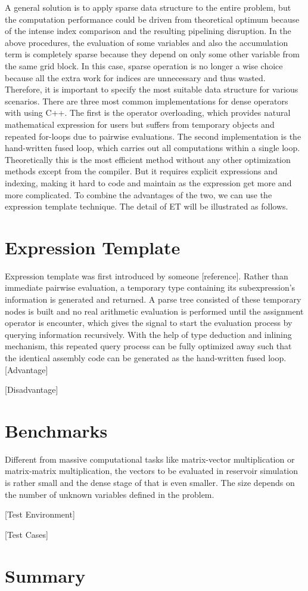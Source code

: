 \documentclass[10pt]{article}
\begin{document}
A general solution is to apply sparse data structure to the entire problem, but the computation performance could be driven from theoretical optimum because of the intense index comparison and the resulting pipelining disruption. In the above procedures, the evaluation of some variables and also the accumulation term is completely sparse because they depend on only some other variable from the same grid block. In this case, sparse operation is no longer a wise choice because all the extra work for indices are unnecessary and thus wasted. Therefore, it is important to specify the most suitable data structure for various scenarios.
There are three most common implementations for dense operators with using C++. The first is the operator overloading, which provides natural mathematical expression for users but suffers from temporary objects  and repeated for-loops due to pairwise evaluations. The second implementation is the hand-written fused loop, which carries out all computations within a single loop. Theoretically this is the most efficient method without any other optimization methods except from the compiler. But it requires explicit expressions and indexing, making it hard to code and maintain as the expression get more and more complicated. To combine the advantages of the two, we can use the expression template technique. The detail of ET will be illustrated as follows.

\section{Expression Template}
Expression template was first introduced by someone [reference]. Rather than immediate pairwise evaluation, a temporary type containing its subexpression's information is generated and returned. A parse tree consisted of these temporary nodes is built and no real arithmetic evaluation is performed until the assignment operator is encounter, which gives the signal to start the evaluation process by querying information recursively. With the help of type deduction and inlining mechanism, this repeated query process can be fully optimized away such that the identical assembly code can be generated as the hand-written fused loop.
[Advantage]

[Disadvantage]




\section{Benchmarks}
Different from massive computational tasks like matrix-vector multiplication or matrix-matrix multiplication, the vectors to be evaluated in reservoir simulation is rather small and the dense stage of that is even smaller. The size depends on the number of unknown variables defined in the problem.

[Test Environment]

[Test Cases]

\section{Summary}
\end{document}
